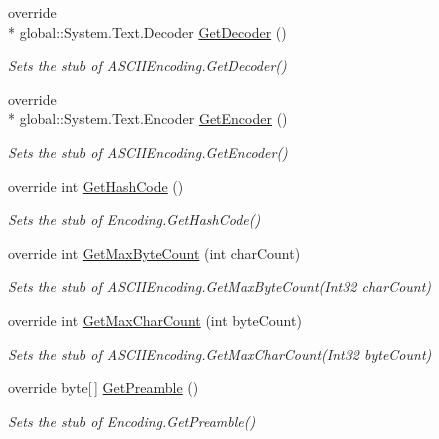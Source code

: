 \begin{DoxyCompactItemize}
override \\*
global\-::\-System.\-Text.\-Decoder \hyperlink{class_system_1_1_text_1_1_fakes_1_1_stub_a_s_c_i_i_encoding_a90e57771a27473476079c2ba912030d4}{Get\-Decoder} ()
\begin{DoxyCompactList}\small\item\em Sets the stub of A\-S\-C\-I\-I\-Encoding.\-Get\-Decoder()\end{DoxyCompactList}\item 
override \\*
global\-::\-System.\-Text.\-Encoder \hyperlink{class_system_1_1_text_1_1_fakes_1_1_stub_a_s_c_i_i_encoding_acc3f8c9ebbbc0ea4b6e28ef9007be0c0}{Get\-Encoder} ()
\begin{DoxyCompactList}\small\item\em Sets the stub of A\-S\-C\-I\-I\-Encoding.\-Get\-Encoder()\end{DoxyCompactList}\item 
override int \hyperlink{class_system_1_1_text_1_1_fakes_1_1_stub_a_s_c_i_i_encoding_ac4160a84f4ab88ebbf924301ffca2200}{Get\-Hash\-Code} ()
\begin{DoxyCompactList}\small\item\em Sets the stub of Encoding.\-Get\-Hash\-Code()\end{DoxyCompactList}\item 
override int \hyperlink{class_system_1_1_text_1_1_fakes_1_1_stub_a_s_c_i_i_encoding_ad1b7234b2d0d7449767787967f501e3a}{Get\-Max\-Byte\-Count} (int char\-Count)
\begin{DoxyCompactList}\small\item\em Sets the stub of A\-S\-C\-I\-I\-Encoding.\-Get\-Max\-Byte\-Count(\-Int32 char\-Count)\end{DoxyCompactList}\item 
override int \hyperlink{class_system_1_1_text_1_1_fakes_1_1_stub_a_s_c_i_i_encoding_a083a0389afc55101d5f6d4b3041a0c3c}{Get\-Max\-Char\-Count} (int byte\-Count)
\begin{DoxyCompactList}\small\item\em Sets the stub of A\-S\-C\-I\-I\-Encoding.\-Get\-Max\-Char\-Count(\-Int32 byte\-Count)\end{DoxyCompactList}\item 
override byte\mbox{[}$\,$\mbox{]} \hyperlink{class_system_1_1_text_1_1_fakes_1_1_stub_a_s_c_i_i_encoding_a90e0c02e6035f9cdae6d79cd53ad8571}{Get\-Preamble} ()
\begin{DoxyCompactList}\small\item\em Sets the stub of Encoding.\-Get\-Preamble()\end{DoxyCompactList}\item 

\end{DoxyCompactItemize}
